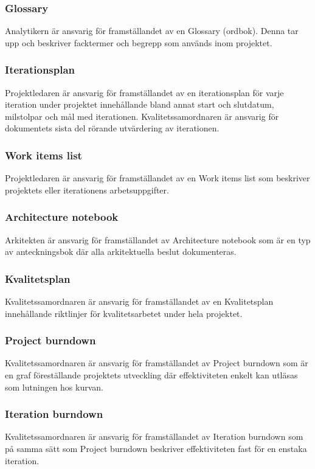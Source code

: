 \subsubsection{Glossary}
Analytikern är ansvarig för framställandet av en Glossary (ordbok). Denna tar upp och beskriver facktermer och begrepp som används inom projektet.

\subsubsection{Iterationsplan}
Projektledaren är ansvarig för framställandet av en iterationsplan för varje iteration under projektet innehållande bland annat start och slutdatum, milstolpar och mål med iterationen. Kvalitetssamordnaren är ansvarig för dokumentets sista del rörande utvärdering av iterationen.

\subsubsection{Work items list}
Projektledaren är ansvarig för framställandet av en Work items list som beskriver projektets eller iterationens arbetsuppgifter.

\subsubsection{Architecture notebook}
Arkitekten är ansvarig för framställandet av Architecture notebook som är en typ av anteckningsbok där alla arkitektuella beslut dokumenteras.

\subsubsection{Kvalitetsplan}
Kvalitetssamordnaren är ansvarig för framställandet av en Kvalitetsplan innehållande riktlinjer för kvalitetsarbetet under hela projektet.

\subsubsection{Project burndown}
Kvalitetssamordnaren är ansvarig för framställandet av Project burndown som är en graf föreställande projektets utveckling där effektiviteten enkelt kan utläsas som lutningen hos kurvan.

\subsubsection{Iteration burndown}
Kvalitetssamordnaren är ansvarig för framställandet av Iteration burndown som på samma sätt som Project burndown beskriver effektiviteten fast för en enstaka iteration.

